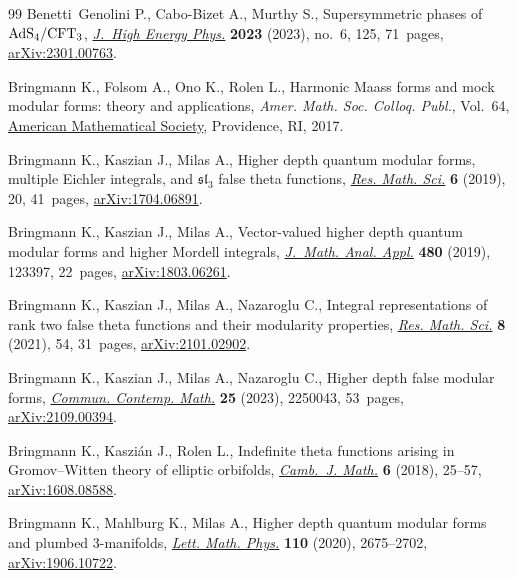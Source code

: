 \begin{thebibliography}{99}
Benetti~Genolini P., Cabo-Bizet A., Murthy S., Supersymmetric phases of {${\rm
 AdS}_4/{\rm CFT}_3$}, \href{https://doi.org/10.1007/jhep06(2023)125}{\textit{J.~High Energy Phys.}} \textbf{2023} (2023),
 no.~6, 125, 71~pages, \href{https://arxiv.org/abs/2301.00763}{arXiv:2301.00763}.

Bringmann K., Folsom A., Ono K., Rolen L., Harmonic {M}aass forms and mock
 modular forms: theory and applications, \textit{Amer. Math. Soc. Colloq.
 Publ.}, Vol.~64, \href{https://doi.org/10.1090/coll/064}{American Mathematical Society}, Providence, RI, 2017.

Bringmann K., Kaszian J., Milas A., Higher depth quantum modular forms,
 multiple {E}ichler integrals, and {$\mathfrak{sl}_3$} false theta functions,
 \href{https://doi.org/10.1007/s40687-019-0182-4}{\textit{Res. Math. Sci.}} \textbf{6} (2019), 20, 41~pages,
 \href{https://arxiv.org/abs/1704.06891}{arXiv:1704.06891}.

Bringmann K., Kaszian J., Milas A., Vector-valued higher depth quantum modular
 forms and higher {M}ordell integrals, \href{https://doi.org/10.1016/j.jmaa.2019.123397}{\textit{J.~Math. Anal. Appl.}}
 \textbf{480} (2019), 123397, 22~pages, \href{https://arxiv.org/abs/1803.06261}{arXiv:1803.06261}.

Bringmann K., Kaszian J., Milas A., Nazaroglu C., Integral representations of
 rank two false theta functions and their modularity properties, \href{https://doi.org/10.1007/s40687-021-00284-1}{\textit{Res.
 Math. Sci.}} \textbf{8} (2021), 54, 31~pages, \href{https://arxiv.org/abs/2101.02902}{arXiv:2101.02902}.

Bringmann K., Kaszian J., Milas A., Nazaroglu C., Higher depth false modular
 forms, \href{https://doi.org/10.1142/S0219199722500432}{\textit{Commun. Contemp. Math.}} \textbf{25} (2023), 2250043, 53~pages,
 \href{https://arxiv.org/abs/2109.00394}{arXiv:2109.00394}.

Bringmann K., Kaszi\'an J., Rolen L., Indefinite theta functions arising in
 {G}romov--{W}itten theory of elliptic orbifolds, \href{https://doi.org/10.4310/CJM.2018.v6.n1.a2}{\textit{Camb.~J. Math.}}
 \textbf{6} (2018), 25--57, \href{https://arxiv.org/abs/1608.08588}{arXiv:1608.08588}.

Bringmann K., Mahlburg K., Milas A., Higher depth quantum modular forms and
 plumbed 3-manifolds, \href{https://doi.org/10.1007/s11005-020-01310-z}{\textit{Lett. Math. Phys.}} \textbf{110} (2020),
 2675--2702, \href{https://arxiv.org/abs/1906.10722}{arXiv:1906.10722}.


\end{thebibliography}
